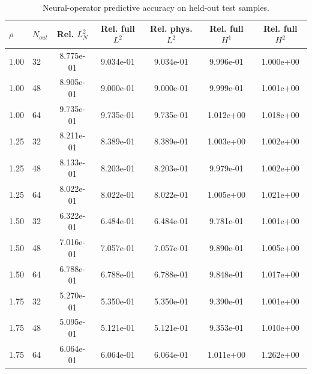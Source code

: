 \begin{table}[h]
\centering
\small
\begin{tabular}{llccccc}
\toprule
$\rho$ & $N_{out}$ & Rel. $L^2_N$ & Rel. full $L^2$ & Rel. phys. $L^2$ & Rel. full $H^{1}$ & Rel. full $H^{2}$ \\
\midrule
1.00 & 32 & 8.775e-01 & 9.034e-01 & 9.034e-01 & 9.996e-01 & 1.000e+00 \\
1.00 & 48 & 8.905e-01 & 9.000e-01 & 9.000e-01 & 9.999e-01 & 1.001e+00 \\
1.00 & 64 & 9.735e-01 & 9.735e-01 & 9.735e-01 & 1.012e+00 & 1.018e+00 \\
1.25 & 32 & 8.211e-01 & 8.389e-01 & 8.389e-01 & 1.003e+00 & 1.002e+00 \\
1.25 & 48 & 8.133e-01 & 8.203e-01 & 8.203e-01 & 9.979e-01 & 1.002e+00 \\
1.25 & 64 & 8.022e-01 & 8.022e-01 & 8.022e-01 & 1.005e+00 & 1.021e+00 \\
1.50 & 32 & 6.322e-01 & 6.484e-01 & 6.484e-01 & 9.781e-01 & 1.001e+00 \\
1.50 & 48 & 7.016e-01 & 7.057e-01 & 7.057e-01 & 9.890e-01 & 1.005e+00 \\
1.50 & 64 & 6.788e-01 & 6.788e-01 & 6.788e-01 & 9.848e-01 & 1.017e+00 \\
1.75 & 32 & 5.270e-01 & 5.350e-01 & 5.350e-01 & 9.390e-01 & 1.001e+00 \\
1.75 & 48 & 5.095e-01 & 5.121e-01 & 5.121e-01 & 9.353e-01 & 1.010e+00 \\
1.75 & 64 & 6.064e-01 & 6.064e-01 & 6.064e-01 & 1.011e+00 & 1.262e+00 \\
\bottomrule
\end{tabular}
\caption{Neural-operator predictive accuracy on held-out test samples.}
\label{tab:operator_accuracy_grin_fiber}
\end{table}

